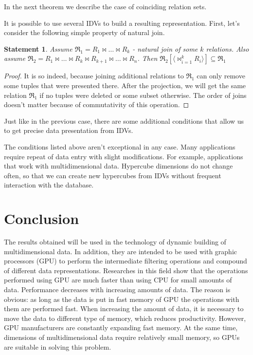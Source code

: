 \documentclass[prodmode,acmtods]{acmsmall} %
\newtheorem{statement}{Statement}
\begin{document}
In the next theorem we describe the case of coinciding relation sets.



It is possible to use several IDVs to build a resulting representation. First,
let's consider the following simple property of natural join.

\begin{statement}
Assume $\Re_1 = R_1 \Join \dots \Join R_k$ - natural join of some $k$ relations.
Also assume $\Re_2 = R_1 \Join \dots \Join R_k \Join R_{k+1} \Join \dots \Join
R_{n}$. Then $\Re_2 [\langle \Join_{i=1}^{k} R_i \rangle] \subseteq \Re_1$
\label{join_property}
\end{statement}
\begin{proof}
It is so indeed, because joining additional relations to $\Re_1$ can only
remove some tuples that were presented there. After the projection, we will get
the same relation $\Re_1$ if no tuples were deleted or some subset otherwise. The
order of joins doesn't matter because of commutativity of this operation.
\end{proof}



Just like in the previous case, there are some additional conditions that allow
us to get precise data presentation from IDVs.



The conditions listed above aren't exceptional in any case. Many applications
require repeat of data entry with slight modifications. For example,
applications that
work with multidimensional data. Hypercube dimensions do not change often, so
that we can create new hypercubes from IDVs without frequent interaction with
the database. 

\section{Conclusion}
The results obtained will be used in the technology of dynamic building of
multidimensional data. In addition, they are intended to be used with graphic
processors (GPU) to perform the intermediate filtering operations and compound
of different data representations. Researches in this field show that the
operations performed using GPU are much faster than using CPU for small amounts of
data. Performance decreases with increasing amounts of data. The reason is
obvious: as long as the data is put in fast memory of GPU the operations with
them are performed fast. When increasing the amount of data, it is necessary to
move the data to different type of memory, which reduces productivity. However,
GPU
manufacturers are constantly expanding fast memory. At the same time, dimensions
of multidimensional data require relatively small memory, so GPUs are suitable
in solving this problem.
\end{document}
